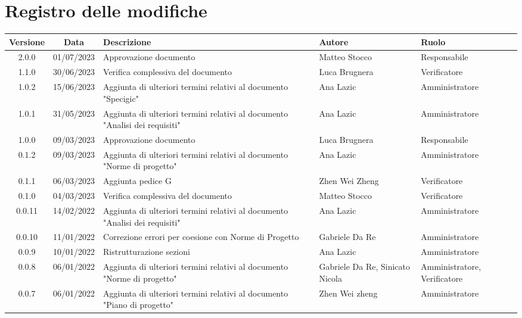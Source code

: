 \section*{Registro delle modifiche}
\begin{center}
\setlength\extrarowheight{5pt}
\renewcommand\tabularxcolumn[1]{>{\Centering}m{#1}}
\begin{tabularx}{\textwidth}{| c | c | X | X | X |} 
\hline
\rowcolor{white}
\textbf{Versione} & \textbf{Data} & \textbf{Descrizione} & \textbf{Autore} & \textbf{Ruolo}\\
\hline
2.0.0 & 01/07/2023 & Approvazione documento & Matteo Stocco & Responsabile\\
\hline
1.1.0 & 30/06/2023 & Verifica complessiva del documento & Luca Brugnera & Verificatore \\
\hline
1.0.2 & 15/06/2023 & Aggiunta di ulteriori termini relativi al documento "Specigic" & Ana Lazic & Amministratore \\
\hline
1.0.1 & 31/05/2023 & Aggiunta di ulteriori termini relativi al documento "Analisi dei requisiti" & Ana Lazic & Amministratore \\
\hline
1.0.0 & 09/03/2023 & Approvazione documento & Luca Brugnera & Responsabile \\
\hline
0.1.2 & 09/03/2023 & Aggiunta di ulteriori termini relativi al documento "Norme di progetto" & Ana Lazic & Amministratore \\
\hline
0.1.1 & 06/03/2023 & Aggiunta pedice G & Zhen Wei Zheng & Verificatore \\
\hline
0.1.0 & 04/03/2023 & Verifica complessiva del documento & Matteo Stocco & Verificatore \\
\hline
 0.0.11 & 14/02/2022 & Aggiunta di ulteriori termini relativi al documento "Analisi dei requisiti" & Ana Lazic & Amministratore \\
 \hline
 0.0.10 & 11/01/2022 & Correzione errori per coesione con Norme di Progetto & Gabriele Da Re & Amministratore \\
 \hline
 0.0.9 & 10/01/2022 & Ristrutturazione sezioni & Ana Lazic & Amministratore \\
 \hline
 0.0.8 & 06/01/2022 & Aggiunta di ulteriori termini relativi al documento "Norme di progetto" & Gabriele Da Re, Sinicato Nicola & Amministratore, Verificatore \\
 \hline
 0.0.7 & 06/01/2022 & Aggiunta di ulteriori termini relativi al documento "Piano di progetto" & Zhen Wei zheng & Amministratore \\

\end{tabularx}
\end{center}
